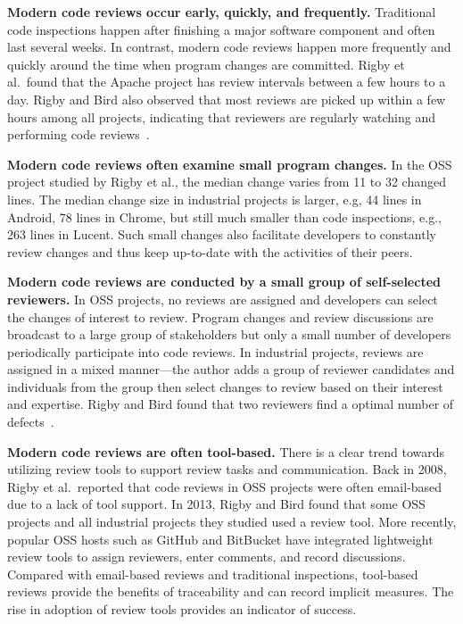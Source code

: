 \documentclass[runningheads,a4paper]{llncs}
\begin{document}
{\bf Modern code reviews occur early, quickly, and frequently.} Traditional code inspections happen after finishing a major software component and often last several weeks. In contrast, modern code reviews happen more frequently and quickly around the time when program changes are committed. Rigby et al.~found that the Apache project has review intervals between a few hours to a day. Rigby and Bird also observed that most reviews are picked up within a few hours among all projects, indicating that reviewers are regularly watching and performing code reviews~\cite{rigby2013convergent}.

{\bf Modern code reviews often examine small program changes.} In the OSS project studied by Rigby et al., the median change varies from 11 to 32 changed lines. The median change size in industrial projects is larger, e.g, 44 lines in Android, 78 lines in Chrome, but still much smaller than code inspections, e.g., 263 lines in Lucent. Such small changes also facilitate developers to constantly review changes and thus keep up-to-date with the activities of their peers. 

{\bf Modern code reviews are conducted by a small group of self-selected reviewers.} 
In OSS projects, no reviews are assigned and developers can select the changes of interest to review. Program changes and review discussions are broadcast to a large group of stakeholders but only a small number of developers periodically participate into code reviews. In industrial projects, reviews are assigned in a mixed manner---the author adds a group of reviewer candidates and individuals from the group then select changes to review based on their interest and expertise. Rigby and Bird found that two reviewers find a optimal number of defects~\cite{rigby2013convergent}.

{\bf Modern code reviews are often tool-based.} There is a clear trend towards utilizing review tools to support review tasks and communication. Back in 2008, Rigby et al.~reported that code reviews in OSS projects were often email-based due to a lack of tool support. In 2013, Rigby and Bird found that some OSS projects and all industrial projects they studied used a review tool. More recently, popular OSS hosts such as GitHub and BitBucket have integrated lightweight review tools to assign reviewers, enter comments, and record discussions. Compared with email-based reviews and traditional inspections, tool-based reviews provide the benefits of traceability and can record implicit measures. The rise in adoption of review tools provides an indicator of success.
\end{document}
